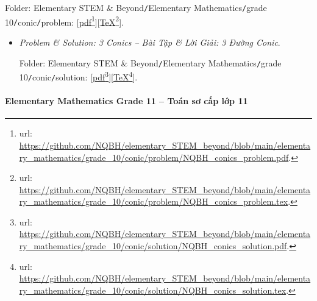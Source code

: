 \documentclass[12pt]{article}
\begin{document}
\begin{enumerate}
	Folder: {\sf Elementary STEM \& Beyond{\tt/}Elementary Mathematics{\tt/}grade 10{\tt/}conic{\tt/}problem}: [\href{https://github.com/NQBH/elementary_STEM_beyond/blob/main/elementary_mathematics/grade_10/conic/problem/NQBH_conics_problem.pdf}{pdf}\footnote{{\sc url}: \url{https://github.com/NQBH/elementary_STEM_beyond/blob/main/elementary_mathematics/grade_10/conic/problem/NQBH_conics_problem.pdf}.}][\href{https://github.com/NQBH/elementary_STEM_beyond/blob/main/elementary_mathematics/grade_10/conic/problem/NQBH_conics_problem.tex}{\TeX}\footnote{{\sc url}: \url{https://github.com/NQBH/elementary_STEM_beyond/blob/main/elementary_mathematics/grade_10/conic/problem/NQBH_conics_problem.tex}.}].
	\begin{itemize}
		\item {\it Problem \& Solution: 3 Conics -- Bài Tập \& Lời Giải: 3 Đường Conic}.
		
		Folder: {\sf Elementary STEM \& Beyond{\tt/}Elementary Mathematics{\tt/}grade 10{\tt/}conic{\tt/}solution}: [\href{https://github.com/NQBH/elementary_STEM_beyond/blob/main/elementary_mathematics/grade_10/conic/solution/NQBH_conics_solution.pdf}{pdf}\footnote{{\sc url}: \url{https://github.com/NQBH/elementary_STEM_beyond/blob/main/elementary_mathematics/grade_10/conic/solution/NQBH_conics_solution.pdf}.}][\href{https://github.com/NQBH/elementary_STEM_beyond/blob/main/elementary_mathematics/grade_10/conic/solution/NQBH_conics_solution.tex}{\TeX}\footnote{{\sc url}: \url{https://github.com/NQBH/elementary_STEM_beyond/blob/main/elementary_mathematics/grade_10/conic/solution/NQBH_conics_solution.tex}.}].
	\end{itemize}
\end{enumerate}

\paragraph{Elementary Mathematics Grade 11 -- Toán sơ cấp lớp 11}
\end{document}

